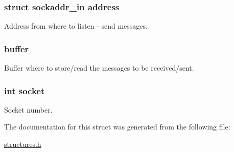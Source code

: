 \subsubsection[{\texorpdfstring{address}{address}}]{\setlength{\rightskip}{0pt plus 5cm}struct sockaddr\+\_\+in address}\hypertarget{struct_m_c_m__thread_struct_a367491879e8ce396250c54956bc6ed5e}{}\label{struct_m_c_m__thread_struct_a367491879e8ce396250c54956bc6ed5e}


Address from where to listen -\/ send messages. 

\subsubsection[{\texorpdfstring{buffer}{buffer}}]{ buffer}\hypertarget{struct_m_c_m__thread_struct_a626d3f45fb464f829c4fc7b78d2b98bf}{}\label{struct_m_c_m__thread_struct_a626d3f45fb464f829c4fc7b78d2b98bf}


Buffer where to store/read the messages to be received/sent. 

\subsubsection[{\texorpdfstring{socket}{socket}}]{\setlength{\rightskip}{0pt plus 5cm}int socket}\hypertarget{struct_m_c_m__thread_struct_a3666576f6b88007cc7b8f26c7da596c8}{}\label{struct_m_c_m__thread_struct_a3666576f6b88007cc7b8f26c7da596c8}


Socket number. 



The documentation for this struct was generated from the following file\+:\begin{DoxyCompactItemize}
\item 
\hyperlink{structures_8h}{structures.\+h}\end{DoxyCompactItemize}

